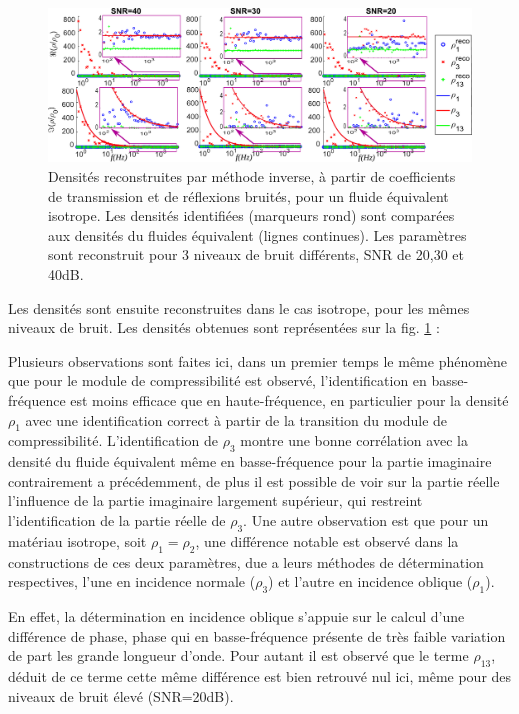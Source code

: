 \documentclass[twoside,openright]{report}
\begin{document}
    \begin{figure}[ht!]
        \centering
        \includegraphics[scale=0.4]{Density_iso_noise.pdf}
        \caption{Densités reconstruites par méthode inverse, à partir de coefficients de transmission et de réflexions bruités, pour un fluide équivalent isotrope. Les densités identifiées (marqueurs rond) sont comparées aux densités du fluides équivalent (lignes continues). Les paramètres sont reconstruit pour 3 niveaux de bruit différents, SNR de 20,30 et 40dB.}
        \label{rho_iso_noise}
    \end{figure}
    Les densités sont ensuite reconstruites dans le cas isotrope, pour les mêmes niveaux de bruit. Les densités obtenues sont représentées sur la fig. \ref{rho_iso_noise} : 
    
    Plusieurs observations sont faites ici, dans un premier temps le même phénomène que pour le module de compressibilité  est observé, l'identification en basse-fréquence est moins efficace que en haute-fréquence, en particulier pour la densité $\rho_1$ avec une identification correct à partir de la transition du module de compressibilité. L'identification de $\rho_3$ montre une bonne corrélation avec la densité du fluide équivalent même en basse-fréquence pour la partie imaginaire contrairement a précédemment, de plus il est possible de voir sur la partie réelle l'influence de la partie imaginaire largement supérieur, qui restreint l'identification de la partie réelle de $\rho_3$. Une autre observation est que pour un matériau isotrope, soit $\rho_1=\rho_2$, une différence notable est observé dans la constructions de ces deux paramètres, due a leurs méthodes de détermination respectives, l'une en incidence normale ($\rho_3$) et l'autre en incidence oblique ($\rho_1$).
    
    En effet, la détermination en incidence oblique s'appuie sur le calcul d'une différence de phase, phase qui en basse-fréquence présente de très faible variation de part les grande longueur d'onde. Pour autant il est observé que le terme $\rho_{13}$, déduit de ce terme cette même différence est bien retrouvé nul ici, même pour des niveaux de bruit élevé (SNR=20dB).
    
\end{document}
